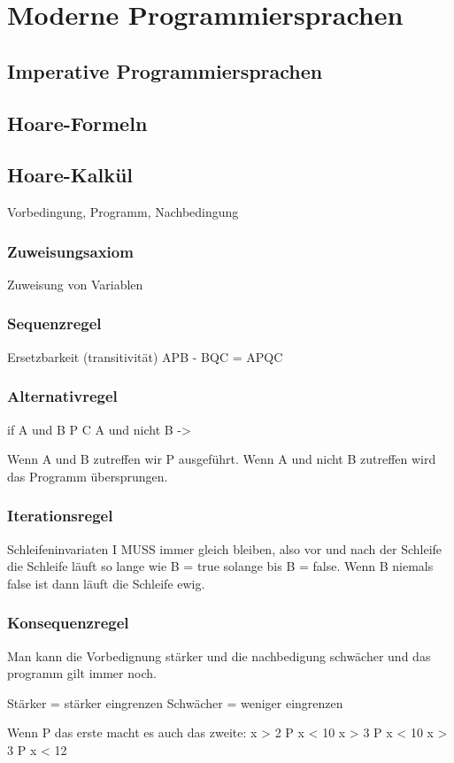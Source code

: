 \chapter{Moderne Programmiersprachen}
\section{Imperative Programmiersprachen}
\section{Hoare-Formeln}
\section{Hoare-Kalkül}

Vorbedingung, Programm, Nachbedingung\\

\subsection{Zuweisungsaxiom}
Zuweisung von Variablen\\

\subsection{Sequenzregel}
Ersetzbarkeit (transitivität) A{P}B - B{Q}C = A{PQ}C

\subsection{Alternativregel}
if
A und B {P} C
A und nicht B ->

Wenn A und B zutreffen wir P ausgeführt. Wenn A und nicht B zutreffen wird das Programm übersprungen.

\subsection{Iterationsregel}
Schleifeninvariaten I MUSS immer gleich bleiben, also vor und nach der Schleife 
die Schleife läuft so lange wie B = true solange bis B = false. Wenn B niemals false ist dann läuft die Schleife ewig.

\subsection{Konsequenzregel}
Man kann die Vorbedignung stärker und die nachbedigung schwächer und das programm gilt immer noch.

Stärker = stärker eingrenzen
Schwächer = weniger eingrenzen 

Wenn P das erste macht es auch das zweite:
x > 2 {P} x < 10
x > 3 {P} x < 10
x > 3 {P} x < 12





